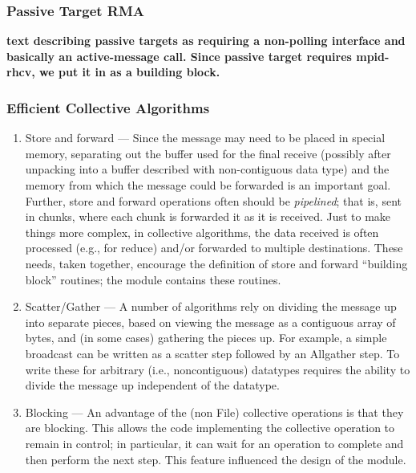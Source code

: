 \documentclass{article}
\begin{document}

\subsubsection{Passive Target RMA}
\label{sec-passive-target}
\textbf{text describing passive targets as requiring a non-polling
interface and basically an active-message call.  Since passive target
requires mpid-rhcv, we put it in as a building block.}

\subsubsection{Efficient Collective Algorithms}
\begin{enumerate}
\item Store and forward --- Since the message may need to be placed in
special memory, separating out the buffer used for the final receive
(possibly after unpacking into a buffer described with non-contiguous
data type) and the memory from which the message could be forwarded is
an important goal.  Further, store and
forward operations often should be \emph{pipelined}; that is, sent in
chunks, where each chunk is forwarded it as it is received.
Just to make things more complex, in collective algorithms, the data
received is often processed (e.g., for reduce) and/or forwarded to
multiple destinations.  These needs, taken together, encourage the
definition of store and forward ``building block'' routines; the 
module contains these routines.

\item Scatter/Gather --- A number of algorithms rely on dividing the
message up into separate pieces, based on viewing the message as a
contiguous array of bytes, and (in some cases) gathering the pieces
up.  For example, a simple broadcast can be written as a scatter step
followed by an Allgather step.  To write these for arbitrary (i.e.,
noncontiguous) datatypes requires the ability to divide the message up
independent of the datatype.  

\item Blocking --- An advantage of the (non File) collective
operations is that they are blocking.  This allows the code
implementing the collective operation to remain in control; in
particular, it can wait for an operation to complete and then perform
the next step.  This feature influenced the design of the
 module.
\end{enumerate}
\end{document}
